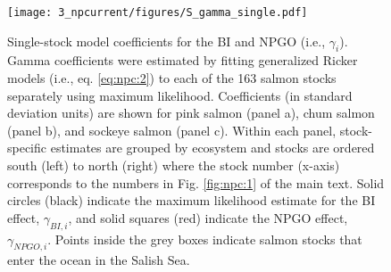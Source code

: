 \begin{figure}[htbp]
  \centering \texttt{[image: 3\_npcurrent/figures/S\_gamma\_single.pdf]}
  \caption[Single-stock model coefficients for the BI and NPGO]{Single-stock
           model coefficients for the BI and NPGO (i.e., $\gamma_i$). Gamma
           coefficients were estimated by fitting generalized Ricker models
           (i.e., eq. \ref{eq:npc:2}) to each of the 163 salmon stocks
           separately using maximum likelihood. Coefficients (in standard
           deviation units) are shown for pink salmon (panel a), chum salmon
           (panel b), and sockeye salmon (panel c). Within each panel,
           stock-specific estimates are grouped by ecosystem and stocks are
           ordered south (left) to north (right) where the stock number (x-axis)
           corresponds to the numbers in Fig. \ref{fig:npc:1} of the main text.
           Solid circles (black) indicate the maximum likelihood estimate for
           the BI effect, $\gamma_{BI,i}$, and solid squares (red) indicate the
           NPGO effect, $\gamma_{NPGO,i}$. Points inside the grey boxes indicate
           salmon stocks that enter the ocean in the Salish Sea.} 
  \label{fig:npc:s3}
\end{figure}



